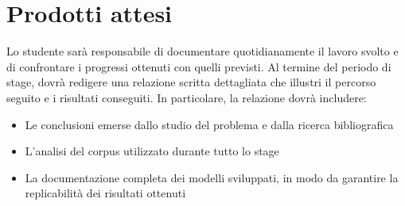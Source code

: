 \section{Prodotti attesi}
Lo studente sarà responsabile di documentare quotidianamente il lavoro svolto e di confrontare i progressi ottenuti con quelli previsti. Al termine del periodo di stage, dovrà redigere una relazione scritta dettagliata che illustri il percorso seguito e i risultati conseguiti. In particolare, la relazione dovrà includere:
\begin{itemize} 
  \item Le conclusioni emerse dallo studio del problema e dalla ricerca bibliografica
  \item L'analisi del corpus utilizzato durante tutto lo stage
  \item La documentazione completa dei modelli sviluppati, in modo da garantire la replicabilità dei risultati ottenuti
\end{itemize}

